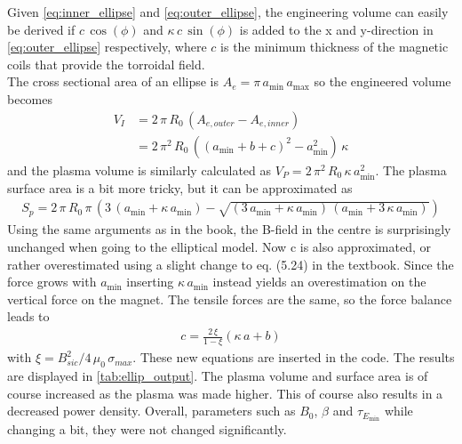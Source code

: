 Given \ref{eq:inner_ellipse} and \ref{eq:outer_ellipse}, the engineering volume can easily be derived if $c\,\cos(\phi)$ and $\kappa\, c\,\sin(\phi)$ is added to the x and y-direction in \ref{eq:outer_ellipse} respectively, where $c$ is the minimum thickness of the magnetic coils that provide the torroidal field. \\
The cross sectional area of an ellipse is $A_{\si{e}}=\pi\, a_{\min}\, a_{\max}$ so the engineered volume becomes
\begin{align}
	V_{\si{I}} & =2\,\pi\, R_{0}\,(A_{\si{e,outer}}-A_{\si{e,inner}}) \nonumber                        \\
	           & = 2\,\pi^{2}\, R_{0}\,\left(\left(a_{\min}+b+c\right)^{2}-a_{\min}^{2}\right)\,\kappa
	\label{eq:engineered_volume}
\end{align}
and the plasma volume is similarly calculated as $V_{\si{P}}=2\,\pi^2\, R_{0}\,\kappa\, a_{\min}^{2}$. The plasma surface area is a bit more tricky, but it can be approximated as
\begin{align}
	S_{\si{p}}=2\,\pi\, R_{0}\,\pi\,(3\,(a_{\min}+\kappa\, a_{\min})-\sqrt{(3\, a_{\min}+\kappa\, a_{\min})\,(a_{\min}+3\,\kappa\, a_{\min})})
\end{align}
Using the same arguments as in the book, the B-field in the centre is surprisingly unchanged when going to the elliptical model. Now c is also approximated, or rather overestimated using a slight change to eq. (5.24) in the textbook. Since the force grows with $a_{\min}$ inserting $\kappa\, a_{\min}$ instead yields an overestimation on the vertical force on the magnet. The tensile forces are the same, so the force balance leads to
\begin{align}
	c=\frac{2\,\xi}{1-\xi}(\kappa\, a+b)
\end{align}
with $\xi=B_{si{c}}^2/4\,\mu_{0}\,\sigma_{\si{max}}$. These new equations are inserted in the code. The results are displayed in \ref{tab:ellip_output}. The plasma volume and surface area is of course increased as the plasma was made higher. This of course also results in a decreased power density. Overall, parameters such as $B_{0}$, $\beta$ and $\tau_{\si{E_{\min}}}$ while changing a bit, they were not changed significantly.
